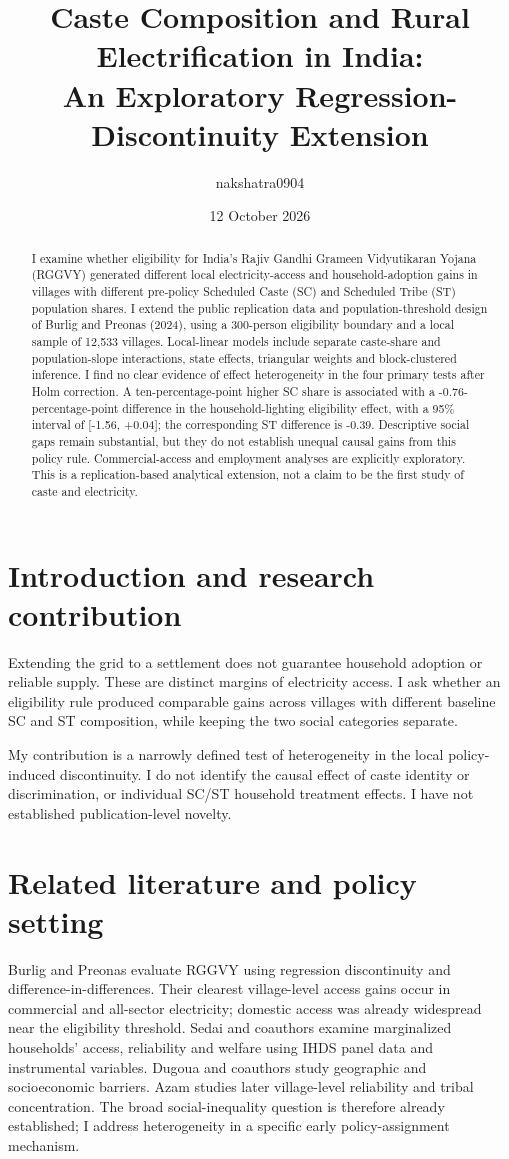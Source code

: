 \documentclass[11pt,a4paper]{article}
\title{Caste Composition and Rural Electrification in India:\\An Exploratory Regression-Discontinuity Extension}
\author{nakshatra0904}
\date{12 October 2026}
\begin{document}
\maketitle
\begin{abstract}
I examine whether eligibility for India's Rajiv Gandhi Grameen Vidyutikaran Yojana (RGGVY) generated different local electricity-access and household-adoption gains in villages with different pre-policy Scheduled Caste (SC) and Scheduled Tribe (ST) population shares. I extend the public replication data and population-threshold design of Burlig and Preonas (2024), using a 300-person eligibility boundary and a local sample of 12,533 villages. Local-linear models include separate caste-share and population-slope interactions, state effects, triangular weights and block-clustered inference. I find no clear evidence of effect heterogeneity in the four primary tests after Holm correction. A ten-percentage-point higher SC share is associated with a -0.76-percentage-point difference in the household-lighting eligibility effect, with a 95\% interval of [-1.56, +0.04]; the corresponding ST difference is -0.39. Descriptive social gaps remain substantial, but they do not establish unequal causal gains from this policy rule. Commercial-access and employment analyses are explicitly exploratory. This is a replication-based analytical extension, not a claim to be the first study of caste and electricity.
\end{abstract}

\section{Introduction and research contribution}
Extending the grid to a settlement does not guarantee household adoption or reliable supply. These are distinct margins of electricity access. I ask whether an eligibility rule produced comparable gains across villages with different baseline SC and ST composition, while keeping the two social categories separate.

My contribution is a narrowly defined test of heterogeneity in the local policy-induced discontinuity. I do not identify the causal effect of caste identity or discrimination, or individual SC/ST household treatment effects. I have not established publication-level novelty.

\section{Related literature and policy setting}
Burlig and Preonas \cite{burlig} evaluate RGGVY using regression discontinuity and difference-in-differences. Their clearest village-level access gains occur in commercial and all-sector electricity; domestic access was already widespread near the eligibility threshold. Sedai and coauthors \cite{sedai} examine marginalized households' access, reliability and welfare using IHDS panel data and instrumental variables. Dugoua and coauthors \cite{dugoua} study geographic and socioeconomic barriers. Azam \cite{azam} studies later village-level reliability and tribal concentration. The broad social-inequality question is therefore already established; I address heterogeneity in a specific early policy-assignment mechanism.
\end{document}
